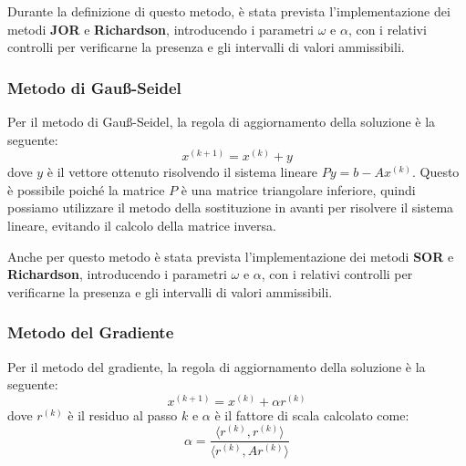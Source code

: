Durante la definizione di questo metodo, è stata prevista l'implementazione dei
metodi \textbf{JOR} e \textbf{Richardson}, introducendo i parametri $\omega$ e
$\alpha$, con i relativi controlli per verificarne la presenza e gli intervalli
di valori ammissibili.

\subsubsection{Metodo di Gauß-Seidel}
Per il metodo di Gauß-Seidel, la regola di aggiornamento della soluzione è la seguente:
\begin{equation}
    x^{(k+1)} = x^{(k)} + y
\end{equation}
dove $y$ è il vettore ottenuto risolvendo il sistema lineare $Py = b - Ax^{(k)}$.
Questo è possibile poiché la matrice $P$ è una matrice triangolare inferiore,
quindi possiamo utilizzare il metodo della sostituzione in avanti per risolvere
il sistema lineare, evitando il calcolo della matrice inversa.

Anche per questo metodo è stata prevista l'implementazione dei metodi \textbf{SOR}
e \textbf{Richardson}, introducendo i parametri $\omega$ e $\alpha$, con i relativi
controlli per verificarne la presenza e gli intervalli di valori ammissibili.

\subsubsection{Metodo del Gradiente}
Per il metodo del gradiente, la regola di aggiornamento della soluzione è la seguente:
\begin{equation}
    x^{(k+1)} = x^{(k)} + \alpha r^{(k)}
\end{equation}
dove $r^{(k)}$ è il residuo al passo $k$ e $\alpha$ è il fattore di scala calcolato
come:
\begin{equation}
    \alpha = \frac{\langle r^{(k)}, r^{(k)}\rangle}{\langle r^{(k)}, Ar^{(k)}\rangle}
\end{equation}


